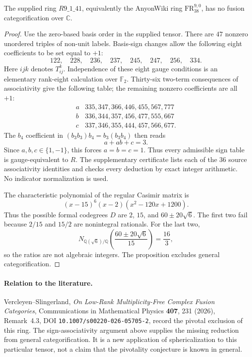\begin{corollary}
The supplied ring $R9\_1\_41$, equivalently the AnyonWiki ring
$\mathrm{FR}^{9,0}_{38}$, has no fusion categorification over
$\mathbb C$.
\end{corollary}
\begin{proof}
Use the zero-based basis order in the supplied tensor. There are
$47$ nonzero unordered triples of non-unit labels. Basis-sign changes
allow the following eight coefficients to be set equal to $+1$:
\[
122,\quad 228,\quad 236,\quad 237,\quad245,\quad247,\quad256,\quad334.
\]
Here $ijk$ denotes $T_{ij}^{k}$. Independence of these eight gauge
conditions is an elementary rank-eight calculation over $\mathbb F_2$.
Thirty-six two-term consequences of associativity give the following
table; the remaining nonzero coefficients are all $+1$:
\[
\begin{array}{c|l}
a&335,347,366,446,455,567,777\\
b&336,344,357,456,477,555,667\\
c&337,346,355,444,457,566,677.
\end{array}
\]
The $b_4$ coefficient in $(b_3b_3)b_4=b_3(b_3b_4)$ then reads
\[
a+ab+c=3.
\]
Since $a,b,c\in\{1,-1\}$, this forces $a=b=c=1$.
Thus every admissible sign table is gauge-equivalent to $R$.
The supplementary certificate lists each of the $36$ source
associativity identities and checks every deduction by exact integer
arithmetic. No indicator normalization is used.

The characteristic polynomial of the regular Casimir matrix is
\[
(x-15)^6(x-2)(x^2-120x+1200).
\]
Thus the possible formal codegrees $D$ are $2$, $15$, and
$60\pm20\sqrt6$. The first two fail because $2/15$ and $15/2$
are nonintegral rationals. For the last two,
\[
N_{\mathbb Q(\sqrt6)/\mathbb Q}\!\left(\frac{60\pm20\sqrt6}{15}\right)
=\frac{16}{3},
\]
so the ratios are not algebraic integers. The proposition excludes
general categorification.
\end{proof}

\paragraph{Relation to the literature.}
Vercleyen--Slingerland, \emph{On Low-Rank Multiplicity-Free Complex
Fusion Categories}, Communications in Mathematical Physics
\textbf{407}, 231 (2026), Remark~4.3,
DOI \texttt{10.1007/s00220-026-05705-2}, record the pivotal exclusion
of this ring. The sign-associativity argument above supplies the
missing reduction from general categorification. It is a new
application of sphericalization to this particular tensor, not a
claim that the pivotality conjecture is known in general.

